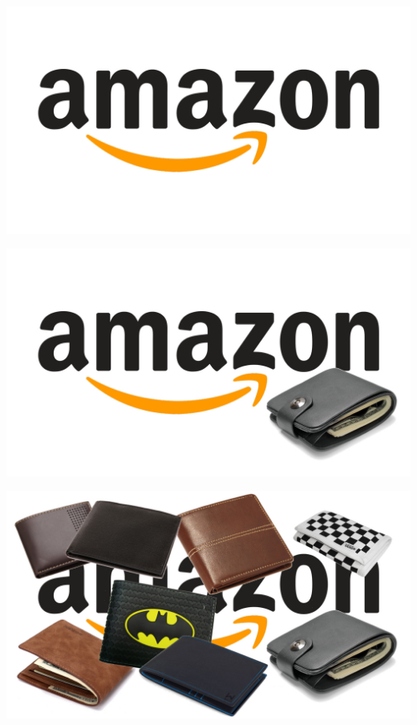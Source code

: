 \documentclass[aspectratio=43,x11names]{beamer}
\begin{document}
\begin{frame}
\begin{center}
\includegraphics[width=\textwidth]{images/amazon-logo.jpg} 
\end{center}
\end{frame}

\begin{frame}
\begin{center}
\includegraphics[width=\textwidth]{images/amazon-one-wallet.jpg} 
\end{center}
\end{frame}

\begin{frame}
\begin{center}
\includegraphics[width=\textwidth]{images/amazon-buncha-wallets.jpg} 
\end{center}
\end{frame}
\end{document}
